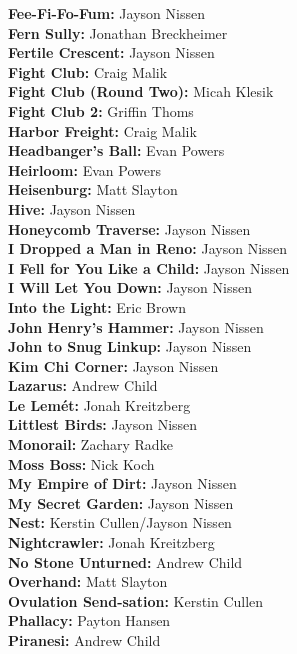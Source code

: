 \begin{flushleft}
\textbf{Fee-Fi-Fo-Fum:} Jayson Nissen\\
\textbf{Fern Sully:} Jonathan Breckheimer\\
\textbf{Fertile Crescent:} Jayson Nissen\\
\textbf{Fight Club:} Craig Malik\\
\textbf{Fight Club (Round Two):} Micah Klesik\\
\textbf{Fight Club 2:} Griffin Thoms\\
\textbf{Harbor Freight:} Craig Malik\\
\textbf{Headbanger's Ball:} Evan Powers\\
\textbf{Heirloom:} Evan Powers\\
\textbf{Heisenburg:} Matt Slayton\\
\textbf{Hive:} Jayson Nissen\\
\textbf{Honeycomb Traverse:} Jayson Nissen\\
\textbf{I Dropped a Man in Reno:} Jayson Nissen\\
\textbf{I Fell for You Like a Child:} Jayson Nissen\\
\textbf{I Will Let You Down:} Jayson Nissen\\
\textbf{Into the Light:} Eric Brown\\
\textbf{John Henry's Hammer:} Jayson Nissen\\
\textbf{John to Snug Linkup:} Jayson Nissen\\
\textbf{Kim Chi Corner:} Jayson Nissen\\
\textbf{Lazarus:} Andrew Child\\
\textbf{Le Lemét:} Jonah Kreitzberg\\
\textbf{Littlest Birds:} Jayson Nissen\\
\textbf{Monorail:} Zachary Radke\\
\textbf{Moss Boss:} Nick Koch\\
\textbf{My Empire of Dirt:} Jayson Nissen\\
\textbf{My Secret Garden:} Jayson Nissen\\
\textbf{Nest:} Kerstin Cullen/Jayson Nissen\\
\textbf{Nightcrawler:} Jonah Kreitzberg\\
\textbf{No Stone Unturned:} Andrew Child\\
\textbf{Overhand:} Matt Slayton\\
\textbf{Ovulation Send-sation:} Kerstin Cullen\\
\textbf{Phallacy:} Payton Hansen\\
\textbf{Piranesi:} Andrew Child\\

\end{flushleft}
